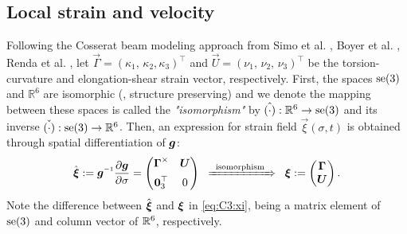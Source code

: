 \subsection{Local strain and velocity}
Following the Cosserat beam modeling approach from Simo et al. \cite{Simo1986}, Boyer et al. \cite{Boyer2021}, Renda et al. \cite{Renda2018,Renda2020}, let $\vec{\Gamma} = (\kappa_1,\, \kappa_2, \kappa_3)^\top$ and $\vec{U} = (\nu_1,\, \nu_2,\, \nu_3)^\top$ be the torsion-curvature and elongation-shear strain vector, respectively. First, the spaces $\textup{\textrm{se}}(3)$ and $\mathbb{R}^6$ are isomorphic (\ie, structure preserving) and we denote the mapping between these spaces is called the \emph{"isomorphism"} by $\hat{(\cdot)}: \mathbb{R}^6 \to \textup{\textrm{se}}(3)$ and its inverse $\check{(\cdot)}: \textup{\textrm{se}}(3) \to \mathbb{R}^6$. Then, an expression for strain field $\vec{\xi}(\sigma,t)$ is obtained through spatial differentiation of $\boldsymbol{g}$:
%
\begin{equation}
\hat{\vec{\xi}} := \mat{g}\inv \frac{\p \mat{g}}{\p \sigma} = \begin{pmatrix} \vec{\Gamma}^\times & \vec{U} \\[0.5em] \vec{0}_3^\top & 0 \end{pmatrix} \;\; \xRightarrow[]{\textrm{\;\;isomorphism\;\;}} \;\; \vec{\xi} := \begin{pmatrix} \vec{\Gamma} \\ \vec{U} \end{pmatrix}.
\label{eq:C3:xi}
\end{equation}
%
Note the difference between $\hat{{\boldsymbol{\xi}}}$ and ${\boldsymbol{\xi}}$ in \eqref{eq:C3:xi}, being a matrix element of $\textup{\textrm{se}}(3)$ and column vector of $\mathbb{R}^6$, respectively. 

